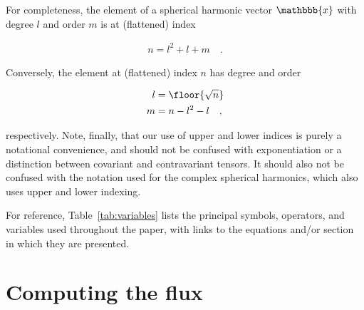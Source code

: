 \documentclass[modern,linenumbers]{aastex62}
\begin{document}
%
For completeness, the element of a spherical harmonic vector $\mathbbb{x}$ with
degree $l$ and order $m$ is at (flattened) index
%
\begin{linenomath}\begin{align}
        \label{eq:n}
        n = l^2 + l + m
        \quad.
    \end{align}\end{linenomath}
%
Conversely, the element at (flattened) index $n$ has degree and order
%
\begin{linenomath}\begin{align}
        \label{eq:lm}
        \begin{split}
            l & = \floor{\sqrt{n}}
            \\
            m & = n - l^2 - l
            \quad,
        \end{split}
    \end{align}\end{linenomath}
%
respectively.
%
Note, finally, that our use of upper and lower indices is purely a
notational convenience,
and should not be confused with
exponentiation or a distinction between covariant and contravariant
tensors. It should also not be confused with the notation used for the complex
spherical harmonics, which also uses upper and lower indexing.
%

For reference, Table~\ref{tab:variables} lists the principal symbols,
operators, and variables used throughout the paper, with links to
the equations and/or section in which they are presented.

\section{Computing the flux}
\label{sec:starry}
\end{document}
